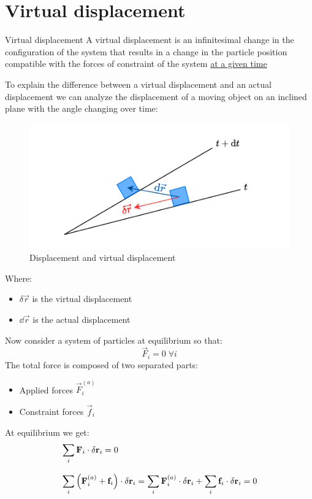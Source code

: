 \section{Virtual displacement}
\begin{definition}{Virtual displacement}
  A virtual displacement is an infinitesimal change in the configuration of the system that results in a change in the particle position compatible with the forces of constraint of the system \underline{at a given time}
\end{definition}
To explain the difference between a virtual displacement and an actual displacement we can analyze the displacement of a moving object on an inclined plane with the angle changing over time:
\begin{figure}[H]
  \centering
  \includegraphics[width=0.5\linewidth]{res/svg/virtualdisplacement.drawio}
  \caption{Displacement and virtual displacement}
  \label{fig:image8}
\end{figure}
Where:
\begin{itemize}
    \item $\delta \vec{r}$ is the virtual displacement
    \item $\dd{\vec{r}}$ is the actual displacement
\end{itemize}
Now consider a system of particles at equilibrium so that:
\begin{equation}
    \vec{F}_i = 0\;\forall i
\end{equation}
The total force is composed of two separated parts:
\begin{itemize}
    \item Applied forces $\vec{F}^{(a)}_i$
    \item Constraint forces $\vec{f}_i$
\end{itemize}
At equilibrium we get:
\begin{equation}
    \begin{split}
      &\displaystyle\sum_i \vb{F}_i \cdot \delta \vb{r}_i = 0 \\[8pt]
      &\displaystyle\sum_i \left(\vb{F}^{(a)}_i + \vb{f}_i\right) \cdot \delta \vb{r}_i = \displaystyle\sum_i \vb{F}^{(a)}_i \cdot \delta \vb{r}_i + \displaystyle\sum_i \vb{f}_i \cdot \delta \vb{r}_i = 0
    \end{split}
\end{equation}

